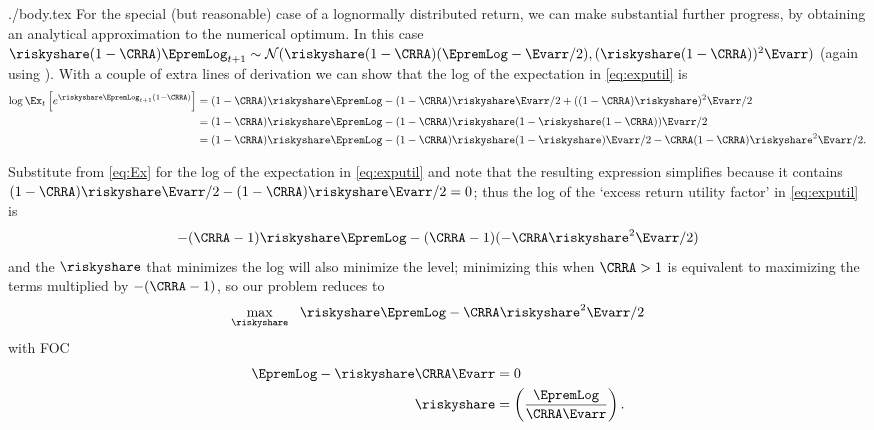 \documentclass{handout}
\begin{document}
\begin{verbatimwrite}{./body.tex}
For the special (but reasonable) case of a lognormally distributed return, we can make substantial further progress, by obtaining
an analytical approximation to the numerical optimum.  In this case $\riskyshare (1-\CRRA) \EpremLog_{t+1} \sim \mathcal{N}(\riskyshare (1-\CRRA)(\EpremLog - \Evarr/2),(\riskyshare(1-\CRRA))^{2}\Evarr)$ (again using \LogELogNormTimes).  With a couple of extra lines of derivation we can show that the log of the expectation in \eqref{eq:exputil} is
\begin{equation}\label{eq:Ex}\begin{split}
  \log \Ex_{t}\left[e^{\riskyshare \EpremLog_{t+1}  (1-\CRRA)}\right] & =  {(1-\CRRA)\riskyshare \EpremLog-(1-\CRRA)\riskyshare\Evarr/2+ ((1-\CRRA)\riskyshare)^{2}\Evarr/2} 
\\  & =  {(1-\CRRA)\riskyshare \EpremLog-(1-\CRRA)\riskyshare(1-\riskyshare(1-\CRRA))\Evarr/2} 
\\  & =  {(1-\CRRA)\riskyshare \EpremLog-(1-\CRRA)\riskyshare(1-\riskyshare)\Evarr/2-\CRRA (1-\CRRA)\riskyshare^{2}\Evarr/2}. 
\end{split}\end{equation}

Substitute from \eqref{eq:Ex} for the log of the expectation in
\eqref{eq:exputil} and note that the resulting expression simplifies because it contains
${(1-\CRRA)\riskyshare\Evarr/2-(1-\CRRA)\riskyshare\Evarr/2}=0$; 
thus the log of the `excess return utility factor' in \eqref{eq:exputil} is
\begin{equation}
  -(\CRRA-1)\riskyshare \EpremLog - (\CRRA-1)(- \CRRA \riskyshare^{2}\Evarr/2)
\end{equation}
and the $\riskyshare$ that minimizes the log will also
minimize the level; minimizing this when $\CRRA>1$ is equivalent to
maximizing the terms multiplied by $-(\CRRA-1)$, so our problem
reduces to
\begin{equation}\begin{gathered}\begin{aligned}
\max_{\riskyshare}~~ \riskyshare \EpremLog -\CRRA\riskyshare^{2}\Evarr/2 
\end{aligned}\end{gathered}\end{equation}
with FOC \hypertarget{riskyshareMS}{} 
\begin{equation}\begin{gathered}\begin{aligned}
         \EpremLog-\riskyshare\CRRA\Evarr  & =  0  \label{eq:riskyshareMS} \\ 
\riskyshare & =  \left(\frac{\EpremLog}{\CRRA \Evarr}\right) .
\end{aligned}\end{gathered}\end{equation}


\end{verbatimwrite}
\end{document}
